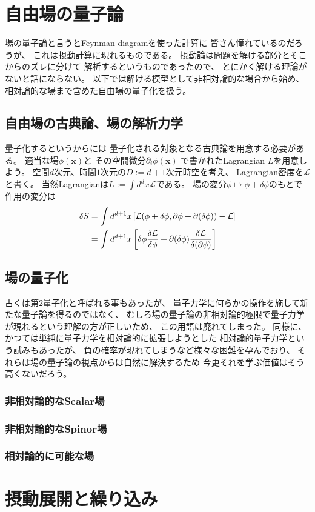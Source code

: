 \section{自由場の量子論}

場の量子論と言うとFeynman diagramを使った計算に
皆さん憧れているのだろうが、
これは摂動計算に現れるものである。
摂動論は問題を解ける部分とそこからのズレに分けて
解析するというものであったので、
とにかく解ける理論がないと話にならない。
以下では解ける模型として非相対論的な場合から始め、
相対論的な場まで含めた自由場の量子化を扱う。

\subsection{自由場の古典論、場の解析力学}

量子化するというからには
量子化される対象となる古典論を用意する必要がある。
適当な場$\phi(\bm{x})$と
その空間微分$\partial_i \phi(\bm{x})$
で書かれたLagrangian $L$を用意しよう。
空間$d$次元、時間$1$次元の$D:= d+1$次元時空を考え、
Lagrangian密度を$\mathcal{L}$と書く。
当然Lagrangianは$L := \int d^d x \mathcal{L}$である。
場の変分$\phi \mapsto \phi + \delta \phi$のもとで
作用の変分は
\begin{align}
    \delta S
    &=
    \int d^{d+1} x
    \left[
        \mathcal{L}(\phi + \delta \phi ,
        \partial \phi + \partial (\delta \phi))
        - \mathcal{L}
    \right]
\notag\\&=
    \int d^{d+1} x
    \left[
        \delta \phi
        \dfrac{\delta \mathcal{L}}{\delta \phi}
        +
        \partial (\delta \phi)
        \dfrac{\delta \mathcal{L}}{\delta (\partial\phi)}
    \right]
\end{align}


\subsection{場の量子化}

古くは第2量子化と呼ばれる事もあったが、
量子力学に何らかの操作を施して新たな量子論を得るのではなく、
むしろ場の量子論の非相対論的極限で量子力学が現れるという理解の方が正しいため、
この用語は廃れてしまった。
同様に、かつては単純に量子力学を相対論的に拡張しようとした
相対論的量子力学という試みもあったが、
負の確率が現れてしまうなど様々な困難を孕んでおり、
それらは場の量子論の視点からは自然に解決するため
今更それを学ぶ価値はそう高くないだろう。

\subsubsection{非相対論的なScalar場}

\subsubsection{非相対論的なSpinor場}

\subsubsection{相対論的に可能な場}

\section{摂動展開と繰り込み}

